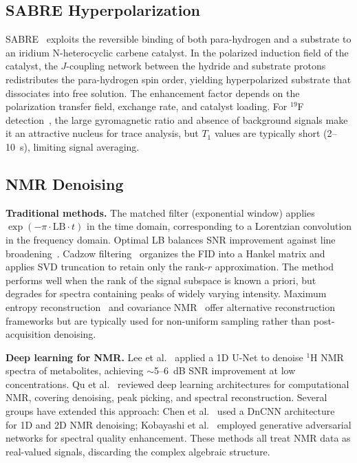 \documentclass{article}
\begin{document}
\subsection{SABRE Hyperpolarization}

SABRE~\cite{Adams2009,Duckett2012} exploits the reversible binding of both para-hydrogen and a substrate to an iridium N-heterocyclic carbene catalyst. In the polarized induction field of the catalyst, the $J$-coupling network between the hydride and substrate protons redistributes the para-hydrogen spin order, yielding hyperpolarized substrate that dissociates into free solution. The enhancement factor depends on the polarization transfer field, exchange rate, and catalyst loading. For $^{19}$F detection~\cite{Barskiy2017,Richardson2019}, the large gyromagnetic ratio and absence of background signals make it an attractive nucleus for trace analysis, but $T_1$ values are typically short (2--10~s), limiting signal averaging.

\subsection{NMR Denoising}

\textbf{Traditional methods.} The matched filter (exponential window) applies $\exp(-\pi\cdot\mathrm{LB}\cdot t)$ in the time domain, corresponding to a Lorentzian convolution in the frequency domain. Optimal LB balances SNR improvement against line broadening~\cite{Levitt2008}. Cadzow filtering~\cite{Cadzow1988} organizes the FID into a Hankel matrix and applies SVD truncation to retain only the rank-$r$ approximation. The method performs well when the rank of the signal subspace is known a priori, but degrades for spectra containing peaks of widely varying intensity. Maximum entropy reconstruction~\cite{Hoch1996} and covariance NMR~\cite{Bruschweiler2004} offer alternative reconstruction frameworks but are typically used for non-uniform sampling rather than post-acquisition denoising.

\textbf{Deep learning for NMR.} Lee et al.~\cite{Lee2021} applied a 1D U-Net to denoise $^1$H NMR spectra of metabolites, achieving $\sim$5--6~dB SNR improvement at low concentrations. Qu et al.~\cite{Qu2024} reviewed deep learning architectures for computational NMR, covering denoising, peak picking, and spectral reconstruction. Several groups have extended this approach: Chen et al.~\cite{Chen2021} used a DnCNN architecture~\cite{Zhang2017} for 1D and 2D NMR denoising; Kobayashi et al.~\cite{Kobayashi2022} employed generative adversarial networks for spectral quality enhancement. These methods all treat NMR data as real-valued signals, discarding the complex algebraic structure.
\end{document}
